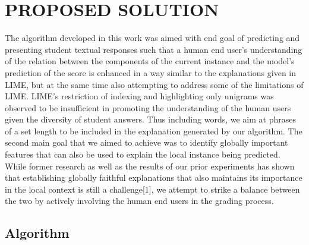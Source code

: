 \documentclass[letterpaper, 10 pt, conference]{ieeeconf}  %
\begin{document}
\section{PROPOSED SOLUTION}

The algorithm developed in this work was aimed with end goal of predicting and presenting student textual responses such that a human end user's understanding of the relation between the components of the current instance and the model's prediction of the score is enhanced in a way similar to the explanations given in LIME, but at the same time also attempting to address some of the limitations of LIME. LIME's restriction of indexing and highlighting only unigrams was observed to be insufficient in promoting the understanding of the human users given the diversity of student answers. Thus including words, we aim at phrases of a set length to be included  in the explanation generated by our algorithm. The second main goal that we aimed to achieve was to identify globally important features that can also be used to explain the local instance being predicted. While former research as well as the results of our prior experiments has shown that establishing globally faithful explanations that also maintains its importance in the local context is still a challenge[1], we attempt to strike a balance between the two by actively involving the human end users in the grading process.

\subsection{Algorithm}
\end{document}

